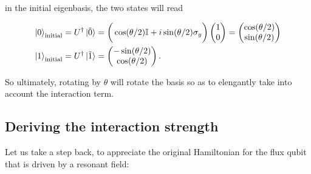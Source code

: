 \noindent in the initial eigenbasis, the two states will read

\begin{equation}
\begin{aligned}
\Ket{0}_{\text{initial}} & = U^{\dagger}\ket{\tilde{0}} = \bigg(\cos(\theta/2)\mathbb{I}+i\sin(\theta/2)\sigma_y\bigg)\begin{pmatrix}
1\\0
\end{pmatrix} = \begin{pmatrix}
\cos(\theta/2)\\\sin(\theta/2)
\end{pmatrix} \\
\Ket{1}_{\text{initial}} & = U^{\dagger}\ket{\tilde{1}} = \begin{pmatrix}
-\sin(\theta/2)\\\cos(\theta/2)
\end{pmatrix}.
\end{aligned}
\end{equation}


\noindent So ultimately, rotating by $ \theta $ will rotate the basis so as to elengantly take into account the interaction term.


  \subsection{Deriving the interaction strength}
   Let us take a step back, to appreciate the original Hamiltonian for the flux qubit that is driven by a resonant field:
   
